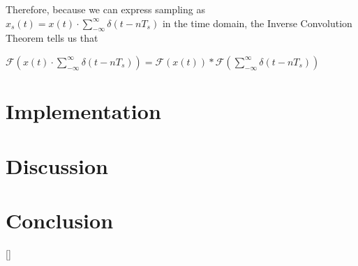 \documentclass{article}
\begin{document}
Therefore, because we can express sampling as $x_s(t) = x(t) \cdot \sum_{-\infty}^{\infty} \delta (t-nT_s)$ in the time domain, the Inverse Convolution Theorem tells us that %
\begin{center}
    \begin{math}
        \mathcal{F}\left(x(t) \cdot \sum_{-\infty}^{\infty} \delta (t-nT_s)\right) = \mathcal{F}(x(t)) * \mathcal{F}\left( \sum_{-\infty}^{\infty} \delta (t-nT_s) \right)
    \end{math}  
\end{center}



\section{Implementation}


\section{Discussion}

\section{Conclusion}

\begin{thebibliography}{9}
    []
\end{thebibliography}
\end{document}
